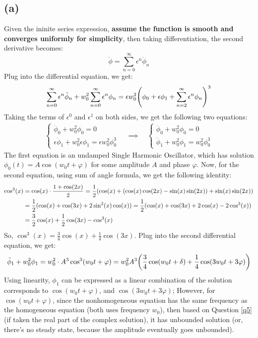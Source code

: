 \documentclass{article}
\DeclarePairedDelimiter{\paran}{(}{)}%
\begin{document}
\subsection*{(a)}
Given the ininite series expression, \textbf{assume the function is smooth and converges uniformly for simplicity}, then taking differentiation, the second derivative becomes:
\begin{equation}
    \ddot\phi = \sum_{n=0}^{\infty}\epsilon^n \ddot\phi_n
\end{equation}
Plug into the differential equation, we get:
\begin{align}
    \sum_{n=0}^{\infty}\epsilon^n \ddot\phi_n + w_0^2\sum_{n=0}^{\infty}\epsilon^n \phi_n = \epsilon w_0^2\paran*{\phi_0 + \epsilon\phi_1 + \sum_{n=2}^{\infty}\epsilon^n \phi_n}^3
\end{align}
Taking the terms of $\epsilon^0$ and $\epsilon^1$ on both sides, we get the following two equations:
\begin{align}
    \begin{cases}
        \ddot \phi_0 + w_0^2\phi_0 = 0\\
        \epsilon \ddot\phi_1 + w_0^2\epsilon \phi_1 = \epsilon w_0^2\phi_0^3
    \end{cases}\quad \implies \quad \begin{cases}
        \ddot \phi_0 + w_0^2\phi_0 = 0\\
        \ddot\phi_1 + w_0^2\phi_1 = w_0^2\phi_0^3
    \end{cases}
\end{align}
The first equation is an undamped Single Harmonic Oscillator, which has solution $\phi_0(t) = A\cos(w_0t+\varphi)$ for some amplitude $A$ and phase $\varphi$. Now, for the second equation, using sum of angle formula, we get the following identity:
\begin{align}
    \cos^3(x) &= \cos(x)\cdot \frac{1+\cos(2x)}{2} = \frac{1}{2}\paran*{\cos(x)+(\cos(x)\cos(2x)-\sin(x)\sin(2x))+\sin(x)\sin(2x)}\\
    &= \frac{1}{2}(\cos(x)+\cos(3x)+2\sin^2(x)\cos(x)) = \frac{1}{2}(\cos(x)+\cos(3x)+2\cos(x)-2\cos^3(x))\\
    &=\frac{3}{2}\cos(x)+\frac{1}{2}\cos(3x)-\cos^3(x)
\end{align}
So, $\cos^3(x) = \frac{3}{4}\cos(x)+\frac{1}{4}\cos(3x)$. Plug into the second differential equation, we get:
\begin{equation}
    \ddot\phi_1 +w_0^2\phi_1 = w_0^2\cdot A^3\cos^3(w_0t+\varphi) = w_0^2A^3\paran*{\frac{3}{4}\cos(w_0t+\delta)+\frac{1}{4}\cos(3w_0t+3\varphi)}
\end{equation}
Using linearity, $\phi_1$ can be expressed as a linear combination of the solution corresponds to $\cos(w_0t+\varphi)$, and $\cos(3w_0t+3\varphi)$; However, for $\cos(w_0t+\varphi)$, since the nonhomogeneous equation has the same frequency as the homogeneous equation (both uses frequency $w_0$), then based on Question \ref{q5} (if taken the real part of the complex solution), it has unbounded solution (or, there's no steady state, because the amplitude eventually goes unbounded).
\end{document}
